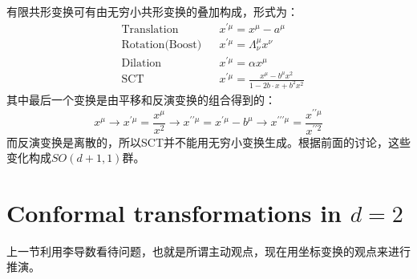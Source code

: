 	有限共形变换可有由无穷小共形变换的叠加构成，形式为：
	\begin{equation}
		\boxed{
			\begin{aligned}
				&\text{Translation}&&x^{\prime \mu}=x^{\mu}-a^{\mu}\\
				&\text{Rotation(Boost)}&&x^{\prime \mu}=\Lambda_{\nu}^{\mu} x^{\nu}\\
				&\text{Dilation}&&x^{\prime \mu}=\alpha x^{\mu}\\
				&\text{SCT}&&x^{\prime \mu}=\frac{x^{\mu}-b^{\mu} x^{2}}{1-2 b\cdot x+b^{2} x^{2}}
			\end{aligned}
		}
	\end{equation}
	其中最后一个变换是由平移和反演变换的组合得到的：
		\begin{equation}
		x^{\mu} \rightarrow x^{\prime \mu}=\frac{x^{\mu}}{x^{2}} \rightarrow x^{\prime \prime \mu}=x^{\prime \mu}-b^{\mu} \rightarrow x^{\prime \prime \prime \mu}=\frac{x^{\prime \prime \mu}}{x^{\prime \prime 2}}
	\end{equation}
	而反演变换是离散的，所以SCT并不能用无穷小变换生成。根据前面的讨论，这些变化构成$SO(d+1,1)$群。
\section{Conformal transformations in $d=2$}
	上一节利用李导数看待问题，也就是所谓主动观点，现在用坐标变换的观点来进行推演。
	
